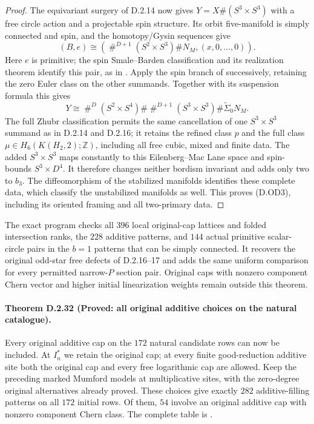 \begin{proof}
The equivariant surgery of D.2.14 now gives
$Y=X\#(S^3\times S^3)$ with a free circle action and a
projectable spin structure. Its orbit five-manifold is
simply connected and spin, and the homotopy/Gysin sequences
give
\[
 (B,e)\cong
 \left(\mathop{\#}^{D+1}(S^2\times S^3)\#N_M,
                        (x,0,\ldots,0)\right).
\]
Here $e$ is primitive; the spin Smale--Barden classification
and its realization theorem identify this pair, as in
\cite[Theorems 2.2--2.3]{manBarden65}.
Apply the spin branch of \cite[Theorem A]{manGR25}
successively, retaining the zero Euler class on the other
summands. Together with its suspension formula this gives
\[
 Y\cong\mathop{\#}^{D}(S^2\times S^4)
       \#\mathop{\#}^{D+1}(S^3\times S^3)
       \#\widetilde\Sigma_0N_M.
\]
The full Zhubr classification permits the same cancellation
of one $S^3\times S^3$ summand as in D.2.14 and D.2.16;
it retains the refined class $p$ and the full class
$\mu\in H_6(K(H_2,2);\mathbb Z)$, including all free cubic,
mixed and finite data. The added $S^3\times S^3$ maps
constantly to this Eilenberg--Mac Lane space and spin-bounds
$S^3\times D^4$. It therefore changes neither bordism
invariant and adds only two to $b_3$. The diffeomorphism of
the stabilized manifolds identifies these complete data,
which classify the unstabilized manifolds as well.
This proves (D.OD3), including its oriented framing and
all two-primary data.
\end{proof}

The exact program 
checks all $396$ local original-cap lattices and folded
intersection ranks, the $228$ additive patterns, and $144$
actual primitive scalar-circle pairs in the $b=1$ patterns
that can be simply connected. It recovers the original
odd-star free defects of D.2.16--17 and adds the same uniform
comparison for every permitted narrow-$P$ section pair.
Original caps with nonzero component Chern vector and higher
initial linearization weights remain outside this theorem.


\paragraph{Theorem D.2.32 (Proved: all original additive choices on the natural catalogue).}
Every original additive cap on the $172$ natural candidate
rows can now be included. At $I_n^*$ we retain the original
cap; at every finite good-reduction additive site both the
original cap and every free logarithmic cap are allowed.
Keep the preceding marked Mumford models at multiplicative
sites, with the zero-degree original alternatives already
proved. These choices give exactly $282$ additive-filling
patterns on all $172$ initial rows. Of them, $54$ involve an
original additive cap with nonzero component Chern class.
The complete table is
.

